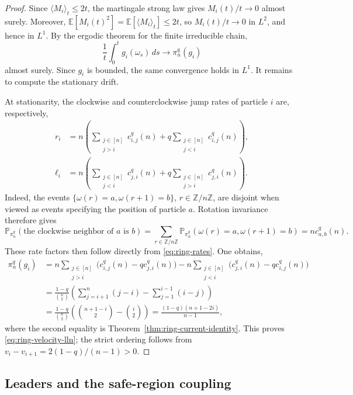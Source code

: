 \documentclass[11pt,a4paper]{amsart}
\theoremstyle{definition}
\theoremstyle{remark}
\numberwithin{equation}{section}
\newcommand{\Z}{\mathbb Z}
\newcommand{\Pp}{\mathbb P}
\newcommand{\Ee}{\mathbb E}
\begin{document}
	\begin{proof}
		Since $\langle M_i\rangle_t\le2t$, the martingale strong law gives
		$M_i(t)/t\to0$ almost surely.  Moreover,
		$\Ee[M_i(t)^2]=\Ee[\langle M_i\rangle_t]\le2t$, so
		$M_i(t)/t\to0$ in $L^2$, and hence in $L^1$.  By the ergodic theorem for the
		finite irreducible chain,
		\[
		\frac1t\int_0^t g_i(\omega_s)\,ds
		\longrightarrow \pi_n^q(g_i)
		\]
		almost surely.  Since $g_i$ is bounded, the same convergence holds in
		$L^1$.  It remains to compute the stationary drift.
		
		At stationarity, the clockwise and counterclockwise jump rates of particle
		$i$ are, respectively,
		\begin{align*}
			r_i&=n\left(\sum_{\substack{j\in[n]\\j>i}}c_{i,j}^q(n)
			+q\sum_{\substack{j\in[n]\\j<i}}c_{i,j}^q(n)\right),\\
			\ell_i&=n\left(\sum_{\substack{j\in[n]\\j<i}}c_{j,i}^q(n)
			+q\sum_{\substack{j\in[n]\\j>i}}c_{j,i}^q(n)\right).
		\end{align*}
		Indeed, the events
		$\{\omega(r)=a,\omega(r+1)=b\}$, $r\in\Z/n\Z$, are disjoint when viewed as
		events specifying the position of particle $a$.  Rotation invariance therefore
		gives
		\[
		\Pp_{\pi_n^q}(\text{the clockwise neighbor of }a\text{ is }b)
		=\sum_{r\in\Z/n\Z}\Pp_{\pi_n^q}(\omega(r)=a,\omega(r+1)=b)
		=n c_{a,b}^q(n).
		\]
		These rate factors then follow directly from
		\eqref{eq:ring-rates}. One obtains,
		\begin{align*}
			\pi_n^q(g_i)
			&=n\sum_{\substack{j\in[n]\\j>i}}
			\bigl(c_{i,j}^q(n)-q c_{j,i}^q(n)\bigr)
			-n\sum_{\substack{j\in[n]\\j<i}}
			\bigl(c_{j,i}^q(n)-q c_{i,j}^q(n)\bigr)\\
			&=\frac{1-q}{\binom n2}
			\left(\sum_{j=i+1}^n(j-i)-\sum_{j=1}^{i-1}(i-j)\right)\\
			&=\frac{1-q}{\binom n2}
			\left(\binom{n+1-i}{2}-\binom{i}{2}\right)
			=\frac{(1-q)(n+1-2i)}{n-1},
		\end{align*}
		where the second equality is Theorem~\ref{thm:ring-current-identity}.
		This proves \eqref{eq:ring-velocity-lln}; the strict ordering follows from
		$v_i-v_{i+1}=2(1-q)/(n-1)>0$.
	\end{proof}
	
	\subsection{Leaders and the safe-region coupling}\label{subsec:leaders}
	
\end{document}
